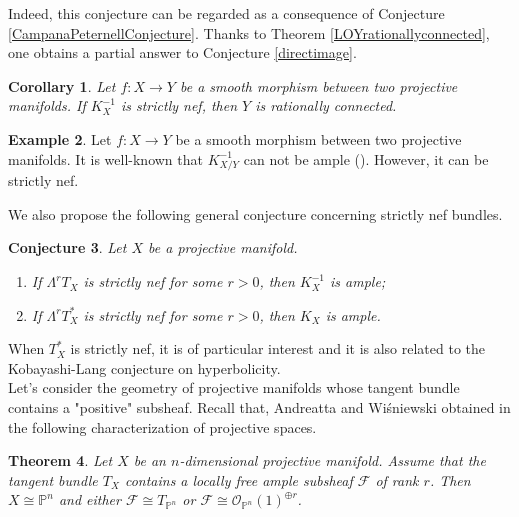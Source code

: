 \documentclass[english,reqno]{amsart}
\newcommand\bbP{{\mathbb P}}
\newcommand\sF{{\mathscr F}}
\newcommand\sO{{\mathscr O}}
\theoremstyle{plain}
\newtheorem{thm}{Theorem}[section]
\newtheorem{cor}[thm]{Corollary}
\newtheorem{conj}[thm]{Conjecture}
\theoremstyle{definition}
\newtheorem{example}[thm]{Example}
\numberwithin{equation}{section} %
\begin{document}
\noindent  Indeed, this conjecture can be regarded as a consequence of Conjecture \ref{CampanaPeternellConjecture}.  Thanks  to Theorem \ref{LOYrationallyconnected}, one obtains   a partial answer to Conjecture \ref{directimage}.

\begin{cor}Let $f:X\rightarrow Y$ be a smooth morphism between two projective manifolds. If $K^{-1}_X$ is strictly nef, then $Y$ is rationally connected.
\end{cor}


\begin{example} Let $f:X\rightarrow Y$ be a smooth morphism between two projective manifolds. It is well-known that $K^{-1}_{X/Y}$ can not be ample (\cite{KollarMiyaokaMori1992}). However, it can be strictly nef.
\end{example}




\noindent We also propose the following general conjecture concerning strictly nef bundles.

\begin{conj}Let $X$ be a projective manifold. \begin{enumerate} \item If $\Lambda^r T_X$ is strictly nef for some $r>0$, then $K^{-1}_X$ is ample;
        \item       If $\Lambda^r T^*_X$ is strictly nef  for some $r>0$, then $K_X$ is ample.

    \end{enumerate}
\end{conj}
\noindent When $T^*_X$ is strictly nef, it is of particular interest  and it is also related to the Kobayashi-Lang conjecture on hyperbolicity.\\









Let's consider the geometry of projective manifolds whose tangent bundle contains a "positive" subsheaf. Recall that,  Andreatta and Wi\'sniewski obtained in \cite[Theorem]{AndreattaWisniewski2001}
the following characterization of projective spaces.
\begin{thm}
    \label{thm:Andreatta-Wisniewski}
    Let $X$ be an $n$-dimensional   projective manifold.
    Assume that the tangent bundle $T_X$ contains a locally free ample subsheaf $\sF$ of rank $r$. Then $X\cong  \bbP^n$ and either $\sF\cong  T_{\bbP^n}$  or $\sF\cong \sO_{\bbP^n}(1)^{\oplus r}$.
\end{thm}
\end{document}
